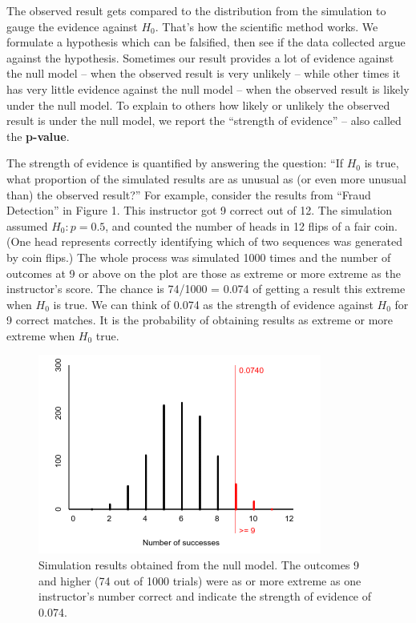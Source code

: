       The observed result gets compared to the distribution from the
      simulation to gauge the evidence against $H_0$.  That's
      how the scientific method works.  We formulate a hypothesis
      which can be falsified, then see if the data collected argue
      against the hypothesis. Sometimes our result provides a lot of
      evidence against the null model  -- when the observed result is very
      unlikely -- while other times it has very little evidence against
      the null model -- when the observed result is likely under the null
      model. To explain to others  how likely or unlikely the
      observed result is under the null model, we  report the
      ``strength of evidence'' -- also called the {\bf p-value}. 

      The strength of evidence is quantified by answering the
      question: ``If $H_0$ is true, what proportion of the simulated
      results are as unusual as (or even more unusual than) the
      observed result?'' 
      For example, consider the results from ``Fraud Detection''  in
      Figure 1. This instructor got 9 correct out of 12.  The
      simulation assumed $H_0: p = 0.5$, and counted the number of
      heads in 12 flips of a fair coin. (One head represents correctly
      identifying which of two sequences was generated by coin flips.)
      The whole process was simulated 1000 times and the number of
      outcomes at 9 or above on the plot are those as extreme or more
      extreme as the instructor's score. The chance is 74/1000 =
      0.074 of getting a result this extreme when $H_0$ is
      true.  We can think of 0.074 as the strength of evidence against
      $H_0$  for 9 correct matches. It is
      the probability of obtaining results as extreme or more extreme
      when $H_0$ true.
 \begin{figure}[h]
   \centering
  \includegraphics[width=.5\linewidth]{../plots/StrOfEvidence-12Guesses.png}

   \caption{ Simulation results obtained from the null model. The
      outcomes 9 and higher (74 out of 1000 trials) were as or more extreme
      as one instructor's number correct and indicate the strength of
      evidence of 0.074. }
   \label{fig:SOE-12}
 \end{figure}


